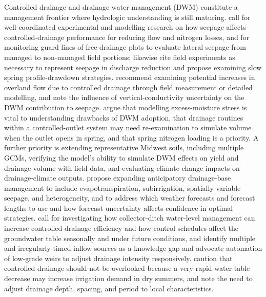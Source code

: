 \documentclass[11pt]{article}
\begin{document}
Controlled drainage and drainage water management (DWM) constitute a
management frontier where hydrologic understanding is still maturing.
\textcite{Youssef2021} call for well-coordinated experimental and modelling
research on how seepage affects controlled-drainage performance for reducing
flow and nitrogen losses, and for monitoring guard lines of free-drainage plots
to evaluate lateral seepage from managed to non-managed field portions;
\textcite{Pease2017} likewise cite field experiments as necessary to represent
seepage in discharge reduction and propose examining slow spring
profile-drawdown strategies. \textcite{Lahdou2019} recommend examining
potential increases in overland flow due to controlled drainage through field
measurement or detailed modelling, and \textcite{Ale2009} note the influence of
vertical-conductivity uncertainty on the DWM contribution to seepage.
\textcite{Craft2018} argue that modelling excess-moisture stress is vital to
understanding drawbacks of DWM adoption, that drainage routines within a
controlled-outlet system may need re-examination to simulate volume when the
outlet opens in spring, and that spring nitrogen loading is a priority.
A further priority is extending representative Midwest soils,
including multiple GCMs, verifying the model's ability to simulate DWM effects
on yield and drainage volume with field data, and evaluating climate-change
impacts on drainage-climate outputs. \textcite{VandeCraats2021} propose
expanding anticipatory drainage-base management to include evapotranspiration,
subirrigation, spatially variable seepage, and heterogeneity, and to address
which weather forecasts and forecast lengths to use and how forecast
uncertainty affects confidence in optimal strategies. \textcite{Salla2022}
call for investigating how collector-ditch water-level management can increase
controlled-drainage efficiency and how control schedules affect the
groundwater table seasonally and under future conditions, and
\textcite{Strock2025b} identify multiple and irregularly timed inflow sources
as a knowledge gap and advocate automation of low-grade weirs to adjust
drainage intensity responsively. \textcite{Güngör2023} caution that
controlled drainage should not be overlooked because a very rapid water-table
decrease may increase irrigation demand in dry summers, and
\textcite{Dou2023} note the need to adjust drainage depth, spacing, and period
to local characteristics.
\end{document}
